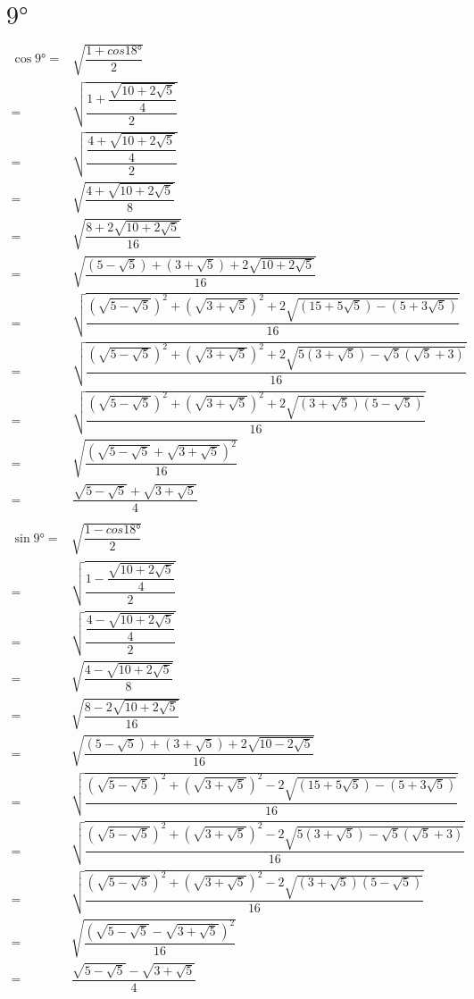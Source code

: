 \section{$\ang{9}$}
\begin{align*}
	\cos\ang{9}=&\sqrt{\dfrac{1+cos\ang{18}}{2}}\\
	=&\sqrt{\dfrac{1+\dfrac{\sqrt{10+2\sqrt{5}}}{4}}{2}}\\
	=&\sqrt{\dfrac{\dfrac{4+\sqrt{10+2\sqrt{5}}}{4}}{2}}\\
	=&\sqrt{\dfrac{4+\sqrt{10+2\sqrt{5}}}{8}}\\
	=&\sqrt{\dfrac{8+2\sqrt{10+2\sqrt{5}}}{16}}\\
	=&\sqrt{\dfrac{(5-\sqrt{5})+(3+\sqrt{5})+2\sqrt{10+2\sqrt{5}}}{16}}\\
	=&\sqrt{\dfrac{\left(\sqrt{5-\sqrt{5}}\right)^2+\left(\sqrt{3+\sqrt{5}}\right)^2+2\sqrt{(15+5\sqrt{5})-(5+3\sqrt{5})}}{16}}\\
	=&\sqrt{\dfrac{\left(\sqrt{5-\sqrt{5}}\right)^2+\left(\sqrt{3+\sqrt{5}}\right)^2+2\sqrt{5(3+\sqrt{5})-\sqrt{5}(\sqrt{5}+3)}}{16}}\\
	=&\sqrt{\dfrac{\left(\sqrt{5-\sqrt{5}}\right)^2+\left(\sqrt{3+\sqrt{5}}\right)^2+2\sqrt{(3+\sqrt{5})(5-\sqrt{5})}}{16}}\\
	=&\sqrt{\dfrac{\left(\sqrt{5-\sqrt{5}}+\sqrt{3+\sqrt{5}}\right)^2}{16}}\\
	=&\dfrac{\sqrt{5-\sqrt{5}}+\sqrt{3+\sqrt{5}}}{4}\\
\end{align*}
\begin{align*}
	\sin\ang{9}=&\sqrt{\dfrac{1-cos\ang{18}}{2}}\\
	=&\sqrt{\dfrac{1-\dfrac{\sqrt{10+2\sqrt{5}}}{4}}{2}}\\
	=&\sqrt{\dfrac{\dfrac{4-\sqrt{10+2\sqrt{5}}}{4}}{2}}\\
	=&\sqrt{\dfrac{4-\sqrt{10+2\sqrt{5}}}{8}}\\
	=&\sqrt{\dfrac{8-2\sqrt{10+2\sqrt{5}}}{16}}\\
	=&\sqrt{\dfrac{(5-\sqrt{5})+(3+\sqrt{5})+2\sqrt{10-2\sqrt{5}}}{16}}\\
	=&\sqrt{\dfrac{\left(\sqrt{5-\sqrt{5}}\right)^2+\left(\sqrt{3+\sqrt{5}}\right)^2-2\sqrt{(15+5\sqrt{5})-(5+3\sqrt{5})}}{16}}\\
	=&\sqrt{\dfrac{\left(\sqrt{5-\sqrt{5}}\right)^2+\left(\sqrt{3+\sqrt{5}}\right)^2-2\sqrt{5(3+\sqrt{5})-\sqrt{5}(\sqrt{5}+3)}}{16}}\\
	=&\sqrt{\dfrac{\left(\sqrt{5-\sqrt{5}}\right)^2+\left(\sqrt{3+\sqrt{5}}\right)^2-2\sqrt{(3+\sqrt{5})(5-\sqrt{5})}}{16}}\\
	=&\sqrt{\dfrac{\left(\sqrt{5-\sqrt{5}}-\sqrt{3+\sqrt{5}}\right)^2}{16}}\\
	=&\dfrac{\sqrt{5-\sqrt{5}}-\sqrt{3+\sqrt{5}}}{4}\\
\end{align*}
